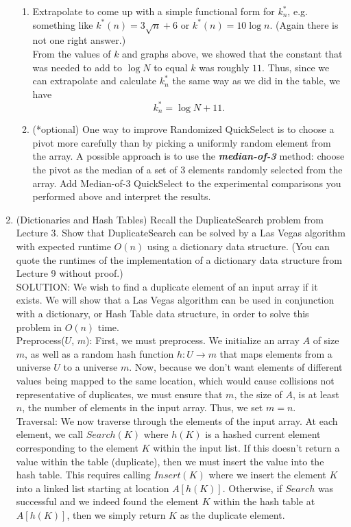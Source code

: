 \documentclass[11pt]{article}
\begin{document}
\begin{enumerate}
\begin{enumerate}
        \item Extrapolate to come up with a simple functional form for $k^*_n$, e.g. something like $k^*(n)=3\sqrt{n}+6$ or $k^*(n)=10\log n$. (Again there is not one right answer.) \\
        
        From the values of $k$ and graphs above, we showed that the constant that was needed to add to $\log N$ to equal $k$ was roughly $11$. Thus, since we can extrapolate and calculate $k^*_n$ the same way as we did in the table, we have 
        $$
        k^*_n = \log N + 11.
        $$

        \item (*optional)  One way to improve Randomized QuickSelect is to choose a pivot more carefully than by picking a uniformly random element from the array. A possible approach is to use the \textit{\textbf{median-of-3}} method: choose the pivot as the median of a set of 3 elements randomly selected from the array. Add Median-of-3 QuickSelect to the experimental comparisons you performed above and interpret the results.
    \end{enumerate}


    \item (Dictionaries and Hash Tables) 
    Recall the DuplicateSearch problem from Lecture 3. Show that DuplicateSearch can be solved by a Las Vegas algorithm with expected runtime $O(n)$ using a dictionary data structure.  (You can quote the runtimes of the implementation of a dictionary data structure from Lecture 9 without proof.) \\
    
    SOLUTION: We wish to find a duplicate element of an input array if it exists. We will show that a Las Vegas algorithm can be used in conjunction with a dictionary, or Hash Table data structure, in order to solve this problem in $O(n)$ time. \\
    
    Preprocess($U$, $m$): First, we must preprocess. We initialize an array $A$ of size $m$, as well as a random hash function $h: U \to m$ that maps elements from a universe $U$ to a universe $m$. Now, because we don't want elements of different values being mapped to the same location, which would cause collisions not representative of duplicates, we must ensure that $m$, the size of $A$, is at least $n$, the number of elements in the input array. Thus, we set $m=n$. \\
    
    Traversal: We now traverse through the elements of the input array. At each element, we call $Search(K)$ where $h(K)$ is a hashed current element corresponding to the element $K$ within the input list. If this doesn't return a value within the table (duplicate), then we must insert the value into the hash table. This requires calling $Insert(K)$ where we insert the element $K$ into a linked list starting at location $A[h(K)]$. Otherwise, if $Search$ was successful and we indeed found the element $K$ within the hash table at $A[h(K)]$, then we simply return $K$ as the duplicate element. \\
    

\end{enumerate}
\end{document}
